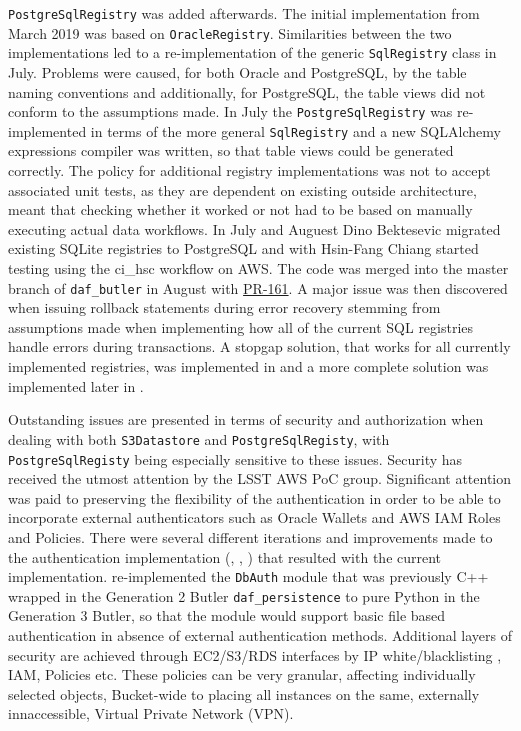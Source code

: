 \texttt{PostgreSqlRegistry} was added afterwards.
The initial implementation from March 2019 was based on \texttt{OracleRegistry}.
Similarities between the two implementations led to a re-implementation of the generic \texttt{SqlRegistry} class in July.
Problems were caused, for both Oracle and PostgreSQL, by the table naming conventions and additionally, for PostgreSQL, the table views did not conform to the assumptions made.
In July the \texttt{PostgreSqlRegistry} was re-implemented in terms of the more general \texttt{SqlRegistry} and a new SQLAlchemy expressions compiler was written, so that table views could be generated correctly.
The policy for additional registry implementations was not to accept associated unit tests, as they are dependent on existing outside architecture, meant that checking whether it worked or not had to be based on manually executing actual data workflows.
In July and Auguest Dino Bektesevic migrated existing SQLite registries to PostgreSQL and with Hsin-Fang Chiang started testing using the ci\_hsc workflow on AWS.
The code was merged into the master branch of \texttt{daf\_butler} in August with \href{https://github.com/lsst/daf_butler/pull/161}{PR-161}.
A major issue was then discovered when issuing rollback statements during error recovery stemming from assumptions made when implementing how all of the current SQL registries handle errors during transactions.
A stopgap solution, that works for all currently implemented registries, was implemented in  and a more complete solution was implemented later in .


Outstanding issues are presented in terms of security and authorization when dealing with both \texttt{S3Datastore} and \texttt{PostgreSqlRegisty}, with \texttt{PostgreSqlRegisty} being especially sensitive to these issues.
Security has received the utmost attention by the LSST AWS PoC group.
Significant attention was paid to preserving the flexibility of the authentication in order to be able to incorporate external authenticators such as Oracle Wallets and AWS IAM Roles and Policies.
There were several different iterations and improvements made to the authentication implementation (, , ) that resulted with the current implementation.
 re-implemented the \texttt{DbAuth} module that was previously C++ wrapped in the Generation 2 Butler \texttt{daf\_persistence} to pure Python in the Generation 3 Butler, so that the module would support basic file based authentication in absence of external authentication methods.
Additional layers of security are achieved through EC2/S3/RDS interfaces by IP white/blacklisting , IAM, Policies etc.
These policies can be very granular, affecting individually selected objects, Bucket-wide to placing all instances on the same, externally innaccessible, Virtual Private Network (VPN).

